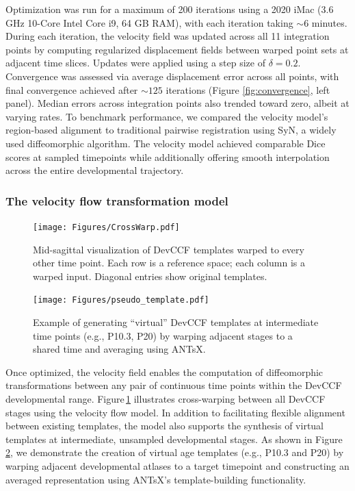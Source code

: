 \documentclass[
  12pt,
]{article}
\begin{document}
Optimization was run for a maximum of 200 iterations using a 2020 iMac
(3.6 GHz 10-Core Intel Core i9, 64 GB RAM), with each iteration taking
\(\sim6\) minutes. During each iteration, the velocity field was updated
across all 11 integration points by computing regularized displacement
fields between warped point sets at adjacent time slices. Updates were
applied using a step size of \(\delta = 0.2\). Convergence was assessed
via average displacement error across all points, with final convergence
achieved after \(\sim125\) iterations (Figure \ref{fig:convergence},
left panel). Median errors across integration points also trended toward
zero, albeit at varying rates. To benchmark performance, we compared the
velocity model's region-based alignment to traditional pairwise
registration using SyN, a widely used diffeomorphic algorithm. The
velocity model achieved comparable Dice scores at sampled timepoints
while additionally offering smooth interpolation across the entire
developmental trajectory.

\subsubsection{The velocity flow transformation
model}\label{the-velocity-flow-transformation-model}

\begin{figure}[!htb]
\centering
\texttt{[image: Figures/CrossWarp.pdf]}
\caption{Mid-sagittal visualization of DevCCF templates warped to every other time point. Each row is a reference space; each column is a warped input. Diagonal entries show original templates.}
\label{fig:crosswarp}
\end{figure}

\begin{figure}[!htb]
\centering
\texttt{[image: Figures/pseudo\_template.pdf]}
\caption{Example of generating “virtual” DevCCF templates at intermediate time points (e.g., P10.3, P20) by warping adjacent stages to a shared time and averaging using ANTsX.}
\label{fig:virtual}
\end{figure}

Once optimized, the velocity field enables the computation of
diffeomorphic transformations between any pair of continuous time points
within the DevCCF developmental range. Figure\,\ref{fig:crosswarp}
illustrates cross-warping between all DevCCF stages using the velocity
flow model. In addition to facilitating flexible alignment between
existing templates, the model also supports the synthesis of virtual
templates at intermediate, unsampled developmental stages. As shown in
Figure\,\ref{fig:virtual}, we demonstrate the creation of virtual age
templates (e.g., P10.3 and P20) by warping adjacent developmental
atlases to a target timepoint and constructing an averaged
representation using ANTsX's template-building functionality.
\end{document}
